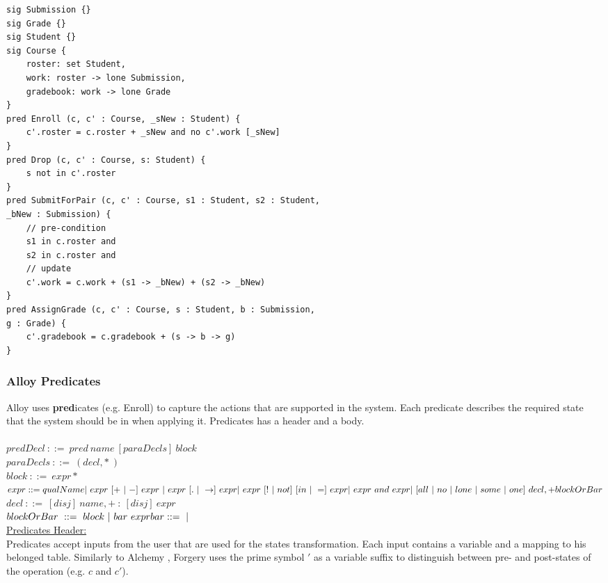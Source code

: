 \documentclass[oneside]{book}
\begin{document}
\begin{lstlisting}
sig Submission {}
sig Grade {}
sig Student {}
sig Course {
	roster: set Student,
	work: roster -> lone Submission,
	gradebook: work -> lone Grade
}
pred Enroll (c, c' : Course, _sNew : Student) {
	c'.roster = c.roster + _sNew and no c'.work [_sNew]
}
pred Drop (c, c' : Course, s: Student) {
	s not in c'.roster 
}
pred SubmitForPair (c, c' : Course, s1 : Student, s2 : Student, 
_bNew : Submission) {
	// pre-condition
	s1 in c.roster and
	s2 in c.roster and
	// update
	c'.work = c.work + (s1 -> _bNew) + (s2 -> _bNew)
}
pred AssignGrade (c, c' : Course, s : Student, b : Submission, 
g : Grade) {
	c'.gradebook = c.gradebook + (s -> b -> g)
}
\end{lstlisting}

\newpage

\subsubsection{Alloy Predicates}

\noindent Alloy uses \textbf{pred}icates (e.g. Enroll) to capture the actions that are supported in the system. Each predicate describes the required state that the system should be in when applying it. Predicates has a header and a body. \\\\
$predDecl\ ::=\ pred\ name\ [paraDecls]\ block$\\
$paraDecls\ ::=\ ( decl,*\ )$\\
$block\ ::=\ { expr* }$\\
$expr ::= qualName\\
|\ expr\ [+\ |\ -]\ expr\ |\ expr\ [.\ |\ \rightarrow]\ expr \\
|\ expr\ [!\ |\ not]\ [in\ |\ =]\ expr\\
|\ expr\ and\ expr\\
|\ [all\ |\ no\ |\ lone\ |\ some\ |\ one]\ decl,+ blockOrBar$\\
$decl\ ::=\ [disj]\ name,+\ :\ [disj]\ expr$\\
$blockOrBar\ ::=\ block\ |\ bar\ expr\\
bar ::=\ |$\\

\noindent\underline{Predicates Header:}\\

\noindent Predicates accept inputs from the user that are used for the states transformation. Each input contains a variable and a mapping to his belonged table. Similarly to Alchemy \cite{alchemy}, Forgery uses the prime symbol $'$ as a variable suffix to distinguish between pre- and post-states of the operation (e.g. $c$ and $c'$).\\
\end{document}
